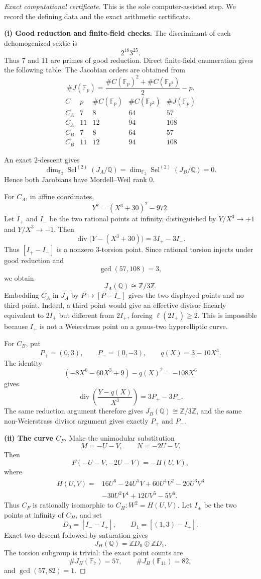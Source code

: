 \documentclass[11pt,a4paper]{article}
\newcommand{\Z}{\mathbb Z}
\newcommand{\Q}{\mathbb Q}
\newcommand{\F}{\mathbb F}
\newcommand{\Sel}{\operatorname{Sel}}
\begin{document}
\begin{proof}[Exact computational certificate]
This is the sole computer-assisted step.  We record the defining data and
the exact arithmetic certificate.

\medskip
\noindent\textbf{(i) Good reduction and finite-field checks.}
The discriminant of each dehomogenized sextic is
\[
2^{18}3^{25}.
\]
Thus $7$ and $11$ are primes of good reduction.  Direct finite-field
enumeration gives the following table.  The Jacobian orders are obtained
from
\[
\#J(\F_p)=\frac{\#C(\F_p)^2+\#C(\F_{p^2})}{2}-p.
\]
\[
\begin{array}{c|c|c|c|c}
C&p&\#C(\F_p)&\#C(\F_{p^2})&\#J(\F_p)\\ \hline
C_A&7&8&64&57\\
C_A&11&12&94&108\\
C_B&7&8&64&57\\
C_B&11&12&94&108
\end{array}
\]

An exact $2$-descent gives
\[
\dim_{\F_2}\Sel^{(2)}(J_A/\Q)
 =\dim_{\F_2}\Sel^{(2)}(J_B/\Q)=0.
\]
Hence both Jacobians have Mordell--Weil rank $0$.

For $C_A$, in affine coordinates,
\[
Y^2=(X^3+30)^2-972.
\]
Let $I_+$ and $I_-$ be the two rational points at infinity, distinguished
by $Y/X^3\to+1$ and $Y/X^3\to-1$.  Then
\[
\operatorname{div}\bigl(Y-(X^3+30)\bigr)=3I_+-3I_-.
\]
Thus $[I_+-I_-]$ is a nonzero $3$-torsion point.  Since rational torsion
injects under good reduction and
\[
\gcd(57,108)=3,
\]
we obtain
\[
J_A(\Q)\cong\Z/3\Z.
\]
Embedding $C_A$ in $J_A$ by $P\mapsto[P-I_-]$ gives the two displayed
points and no third point.  Indeed, a third point would give an effective
divisor linearly equivalent to $2I_+$ but different from $2I_+$, forcing
$\ell(2I_+)\ge2$.  This is impossible because $I_+$ is not a Weierstrass
point on a genus-two hyperelliptic curve.

For $C_B$, put
\[
P_+=(0,3),
\qquad
P_-=(0,-3),
\qquad
q(X)=3-10X^3.
\]
The identity
\[
(-8X^6-60X^3+9)-q(X)^2=-108X^6
\]
gives
\[
\operatorname{div}\left(\frac{Y-q(X)}{X^3}\right)
 =3P_+-3P_-.
\]
The same reduction argument therefore gives
$J_B(\Q)\cong\Z/3\Z$, and the same non-Weierstrass divisor argument gives
exactly $P_+$ and $P_-$.

\medskip
\noindent\textbf{(ii) The curve $C_F$.}
Make the unimodular substitution
\[
M=-U-V,
\qquad
N=-2U-V.
\]
Then
\[
F(-U-V,-2U-V)=-H(U,V),
\]
where
\begin{align*}
H(U,V)={}&16U^6-24U^5V+60U^4V^2-20U^3V^3\\
&-30U^2V^4+12UV^5-5V^6.
\end{align*}
Thus $C_F$ is rationally isomorphic to $C_H:W^2=H(U,V)$.
Let $I_\pm$ be the two points at infinity of $C_H$, and set
\[
D_0=[I_--I_+],
\qquad
D_1=[(1,3)-I_+].
\]
Exact two-descent followed by saturation gives
\[
J_H(\Q)=\Z D_0\oplus\Z D_1.
\]
The torsion subgroup is trivial: the exact point counts are
\[
\#J_H(\F_7)=57,
\qquad
\#J_H(\F_{11})=82,
\]
and $\gcd(57,82)=1$.


\end{proof}
\end{document}

